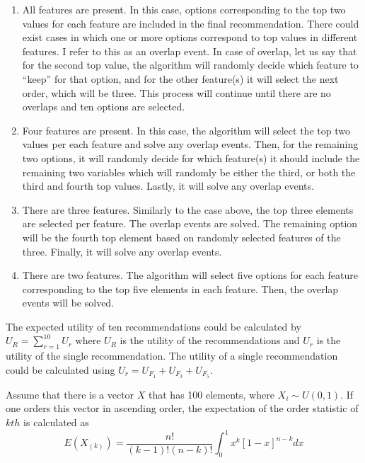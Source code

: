 \documentclass[a4paper,12pt]{article}
\begin{document}
\begin{enumerate}
    \item  All features are present. In this case, options corresponding to the top two values for each feature are included in the final recommendation. There could exist cases in which one or more options correspond to top values in different features. I refer to this as an overlap event. In case of overlap, let us say that for the second top value, the algorithm will randomly decide which feature to ``keep'' for that option, and for the other feature(s) it will select the next order, which will be three. This process will continue until there are no overlaps and ten options are selected.
    \item  Four features are present. In this case, the algorithm will select the top two values per each feature and solve any overlap events. Then, for the remaining two options, it will randomly decide for which feature(s) it should include the remaining two variables which will randomly be either the third, or both the third and fourth top values. Lastly, it will solve any overlap events.
    \item  There are three features. Similarly to the case above, the top three elements are selected per feature. The overlap events are solved. The remaining option will be the fourth top element based on randomly selected features of the three. Finally, it will solve any overlap events.
    \item  There are two features. The algorithm will select five options for each feature corresponding to the top five elements in each feature. Then, the overlap events will be solved.
\end{enumerate}


The expected utility of ten recommendations could be calculated by $U_R = \sum_{r = 1}^{10}{U_r}$ where $U_R$ is the utility of the recommendations and $U_r$ is the utility of the single recommendation. The utility of a single recommendation could be calculated using $U_r = U_{F_1} + U_{F_3} + U_{F_5}$.

Assume that there is a vector $X$ that has 100 elements, where $X_i\sim U\left(0,1\right)$. If one orders this vector in ascending order, the expectation of the order statistic of $kth$ is calculated as
$$
E\left(X_{\left(k\right)}\right)=\frac{n!}{\left(k-1\right)!\left(n-k\right)!}\int_{0}^{1}{x^k\left[1-x\right]^{n-k}dx}
$$
\end{document}
